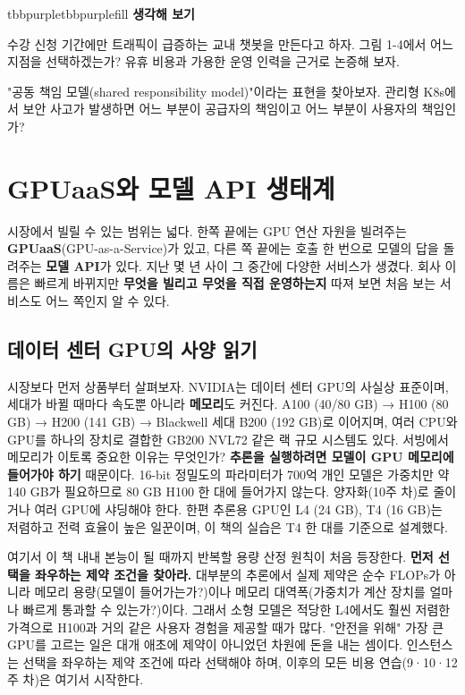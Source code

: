 \begin{calloutbox}{tbbpurple}{tbbpurplefill}
{\normalsize\bfseries\color{tbbpurple}생각해 보기}\par\vspace{3pt}
\begin{tbbitemize}
  \item 수강 신청 기간에만 트래픽이 급증하는 교내 챗봇을 만든다고 하자. 그림 1-4에서 어느 지점을 선택하겠는가? 유휴 비용과 가용한 운영 인력을 근거로 논증해 보자.
  \item "공동 책임 모델(shared responsibility model)"이라는 표현을 찾아보자. 관리형 K8s에서 보안 사고가 발생하면 어느 부분이 공급자의 책임이고 어느 부분이 사용자의 책임인가?
\end{tbbitemize}
\end{calloutbox}

\section{GPUaaS와 모델 API 생태계}

시장에서 빌릴 수 있는 범위는 넓다. 한쪽 끝에는 GPU 연산 자원을 빌려주는 \textbf{GPUaaS}(GPU-as-a-Service)가 있고, 다른 쪽 끝에는 호출 한 번으로 모델의 답을 돌려주는 \textbf{모델 API}가 있다. 지난 몇 년 사이 그 중간에 다양한 서비스가 생겼다. 회사 이름은 빠르게 바뀌지만 \textbf{무엇을 빌리고 무엇을 직접 운영하는지} 따져 보면 처음 보는 서비스도 어느 쪽인지 알 수 있다.

\subsection*{데이터 센터 GPU의 사양 읽기}

시장보다 먼저 상품부터 살펴보자. NVIDIA는 데이터 센터 GPU의 사실상 표준이며, 세대가 바뀔 때마다 속도뿐 아니라 \textbf{메모리}도 커진다. A100 (40/80 GB) → H100 (80 GB) → H200 (141 GB) → Blackwell 세대 B200 (192 GB)로 이어지며, 여러 CPU와 GPU를 하나의 장치로 결합한 GB200 NVL72 같은 랙 규모 시스템도 있다. 서빙에서 메모리가 이토록 중요한 이유는 무엇인가? \textbf{추론을 실행하려면 모델이 GPU 메모리에 들어가야 하기} 때문이다. 16-bit 정밀도의 파라미터가 700억 개인 모델은 가중치만 약 140 GB가 필요하므로 80 GB H100 한 대에 들어가지 않는다. 양자화(10주 차)로 줄이거나 여러 GPU에 샤딩해야 한다. 한편 추론용 GPU인 L4 (24 GB), T4 (16 GB)는 저렴하고 전력 효율이 높은 일꾼이며, 이 책의 실습은 T4 한 대를 기준으로 설계했다.

여기서 이 책 내내 본능이 될 때까지 반복할 용량 산정 원칙이 처음 등장한다. \textbf{먼저 선택을 좌우하는 제약 조건을 찾아라.} 대부분의 추론에서 실제 제약은 순수 FLOPs가 아니라 메모리 용량(모델이 들어가는가?)이나 메모리 대역폭(가중치가 계산 장치를 얼마나 빠르게 통과할 수 있는가?)이다. 그래서 소형 모델은 적당한 L4에서도 훨씬 저렴한 가격으로 H100과 거의 같은 사용자 경험을 제공할 때가 많다. "안전을 위해" 가장 큰 GPU를 고르는 일은 대개 애초에 제약이 아니었던 차원에 돈을 내는 셈이다. 인스턴스는 선택을 좌우하는 제약 조건에 따라 선택해야 하며, 이후의 모든 비용 연습(9·10·12주 차)은 여기서 시작한다.

